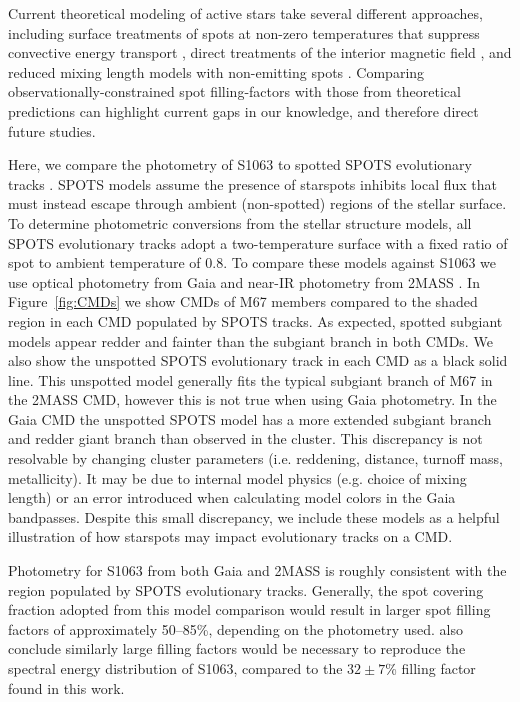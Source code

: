 \documentclass[twocolumn,tighten]{aastex631}
\begin{document}
Current theoretical modeling of active stars take several different approaches, including surface treatments of spots at non-zero temperatures that suppress convective energy transport \citep{somers20}, direct treatments of the interior magnetic field \citep{2013ApJ...779..183F}, and reduced mixing length models with non-emitting spots \citep{2007A&A...472L..17C}. Comparing observationally-constrained spot filling-factors with those from theoretical predictions can highlight current gaps in our knowledge, and therefore direct future studies. 

Here, we compare the photometry of S1063 to spotted SPOTS evolutionary tracks \citep{somers20}. SPOTS models assume the presence of starspots inhibits local flux that must instead escape through ambient (non-spotted) regions of the stellar surface. To determine photometric conversions from the stellar structure models, all SPOTS evolutionary tracks adopt a two-temperature surface with a fixed ratio of spot to ambient temperature of 0.8. To compare these models against S1063 we use optical photometry from Gaia \citep{2016A&A...595A...1G,2018A&A...616A...1G} and near-IR photometry from 2MASS \citep{2mass}. In Figure~\ref{fig:CMDs} we show CMDs of M67 members \citep{geller2015} compared to the shaded region in each CMD populated by SPOTS tracks. As expected, spotted subgiant models appear redder and fainter than the subgiant branch in both CMDs. We also show the unspotted SPOTS evolutionary track in each CMD as a black solid line. This unspotted model generally fits the typical subgiant branch of M67 in the 2MASS CMD, however this is not true when using Gaia photometry. In the Gaia CMD the unspotted SPOTS model has a more extended subgiant branch and redder giant branch than observed in the cluster. This discrepancy is not resolvable by changing cluster parameters (i.e. reddening, distance, turnoff mass, metallicity). It may be due to internal model physics (e.g. choice of mixing length) or an error introduced when calculating model colors in the Gaia bandpasses. Despite this small discrepancy, we include these models as a helpful illustration of how starspots may impact evolutionary tracks on a CMD. 

Photometry for S1063 from both Gaia and 2MASS is roughly consistent with the region populated by SPOTS evolutionary tracks. Generally, the spot covering fraction adopted from this model comparison would result in larger spot filling factors of approximately 50--85\%, depending on the photometry used. \citet{leiner17} also conclude similarly large filling factors would be necessary to reproduce the spectral energy distribution of S1063, compared to the $32\pm7$\% filling factor found in this work.
\end{document}

